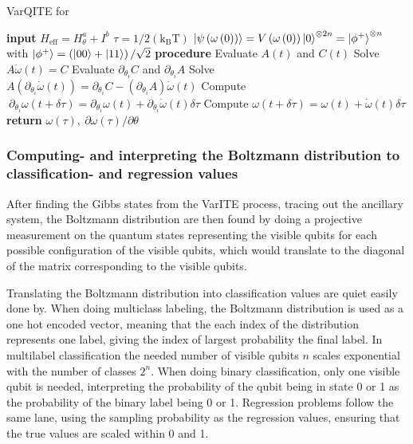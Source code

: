 \documentclass[../main.tex]{subfiles}
\begin{document}
\begin{algorithm}[ht]
 \caption{VarQITE for \varqbm} \label{algo:VarQITE}
\begin{algorithmic}[0]
    \State  \textbf{input}
    \State $H_{\text{eff}} = H_{\theta}^a + I^b$
	\State$\tau = {1}/{2\left(\text{k}_{\text{B}}\text{T}\right)}$
	\State $\ket{\psi\left( \omega\left(0\right)\right)} = V\left(\omega\left(0\right)\right)\ket{0}^{\otimes 2n} = \ket{\phi^{+}}^{\otimes n}$
	\State with $\ket{\phi^{+}} = \left(\ket{00}+\ket{11}\right)/{\sqrt{2}}$
    \State \textbf{procedure}
		\State Evaluate $A\left(t\right)$ and $C\left(t\right)$
		\State Solve $A\dot{\omega}\left(t\right) = C$
    			\State Evaluate $\partial_{\theta_i}C$ and $\partial_{\theta_i}A$
    			\State \label{item:linEqDer}Solve $A\left(\partial_{\theta_i}\dot{\omega}\left(t\right)\right)  = \partial_{\theta_i}C - \left(\partial_{\theta_i}A\right)\dot{\omega}\left(t\right)$
    			\State \label{item:grad_omega_tau}Compute $ \: \partial_{\theta_i}{\omega}\left(t+\delta\tau\right) = \partial_{\theta_i}{\omega}\left(t\right)+\partial_{\theta_i}\dot{\omega}\left(t\right)\delta\tau$
	   \EndFor
		\State \label{item:computeUpdateDer}Compute $\omega\left(t+\delta\tau\right) = \omega\left(t\right) +   \dot{\omega}\left(t\right)\delta\tau $
	\EndFor
	\State \textbf{return} $\omega\left(\tau\right), \: \partial\omega\left(\tau\right)/\partial\theta$
\end{algorithmic}
\end{algorithm}

\subsubsection{Computing- and interpreting the Boltzmann distribution to classification- and regression values}
After finding the Gibbs states from the VarITE process, tracing out the ancillary system, the Boltzmann distribution are then found by doing a projective measurement on the quantum states representing the visible qubits for each possible configuration of the visible qubits, which would translate to the diagonal of the matrix corresponding to the visible qubits.

Translating the Boltzmann distribution into classification values are quiet easily done by. When doing multiclass labeling, the Boltzmann distribution is used as a one hot encoded vector, meaning that the each index of the distribution represents one label, giving the index of largest probability the final label. In multilabel classification the needed number of visible qubits $n$ scales exponential with the number of classes $2^n$. When doing binary classification, only one visible qubit is needed, interpreting the probability of the qubit being in state 0 or 1 as the probability of the binary label being 0 or 1. Regression problems follow the same lane, using the sampling probability as the regression values, ensuring that the true values are scaled within 0 and 1.
\end{document}
